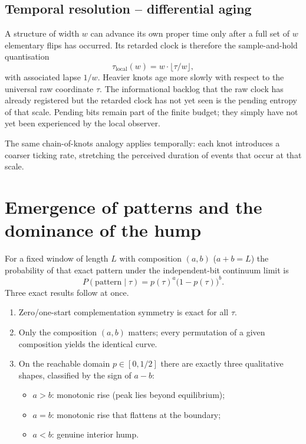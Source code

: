 \documentclass[11pt]{article}
\begin{document}
\subsection{Temporal resolution -- differential aging}

A structure of width \(w\) can advance its own proper time only after 
a full set of \(w\) elementary flips has occurred. Its retarded clock 
is therefore the sample-and-hold quantisation
\begin{equation}
  \tau_{\mathrm{local}}(w)=w\cdot\bigl\lfloor\tau/w\bigr\rfloor,
\end{equation}
with associated lapse \(1/w\). Heavier knots age more slowly with 
respect to the universal raw coordinate \(\tau\). The informational 
backlog that the raw clock has already registered but the retarded 
clock has not yet seen is the pending entropy of that scale. Pending 
bits remain part of the finite budget; they simply have not yet been 
experienced by the local observer.

The same chain-of-knots analogy applies temporally: each knot 
introduces a coarser ticking rate, stretching the perceived duration 
of events that occur at that scale.

\section{Emergence of patterns and the dominance of the hump}

For a fixed window of length \(L\) with composition \((a,b)\) 
(\(a+b=L\)) the probability of that exact pattern under the 
independent-bit continuum limit is
\begin{equation}
  P(\text{pattern}\mid\tau)=p(\tau)^a\bigl(1-p(\tau)\bigr)^b.
\end{equation}
Three exact results follow at once.

\begin{enumerate}
  \item Zero/one-start complementation symmetry is exact for all \(\tau\).
  \item Only the composition \((a,b)\) matters; every permutation of 
        a given composition yields the identical curve.
  \item On the reachable domain \(p\in[0,1/2]\) there are exactly 
        three qualitative shapes, classified by the sign of \(a-b\):
        \begin{itemize}
          \item \(a>b\): monotonic rise (peak lies beyond equilibrium);
          \item \(a=b\): monotonic rise that flattens at the boundary;
          \item \(a<b\): genuine interior hump.
        \end{itemize}
\end{enumerate}
\end{document}
